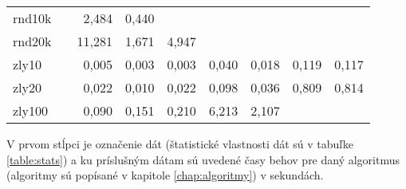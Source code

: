 \begin{table}[h]
\begin{tabular}{l|rrrrrrrr}
		rnd10k  &       & 2,484  & 0,440   &          &            &            &          &         \\
		rnd20k  &       & 11,281 & 1,671   & 4,947    &            &            &          &         \\
		zly10   &       & 0,005  & 0,003   & 0,003    & 0,040      & 0,018      & 0,119    & 0,117   \\
		zly20   &       & 0,022  & 0,010   & 0,022    & 0,098      & 0,036      & 0,809    & 0,814   \\
		zly100  &       & 0,090  & 0,151   & 0,210    & 6,213      & 2,107      &          &         \\ \hline
	\end{tabular}
	\smallskip \par
	V prvom stĺpci je označenie dát (štatistické vlastnosti dát sú v tabuľke 
	\ref{table:stats}) a ku príslušným dátam sú uvedené časy behov pre daný 
	algoritmus (algoritmy sú popísané v kapitole \ref{chap:algoritmy}) v 
	sekundách.
	\label{table:java-stare}
\end{table}

